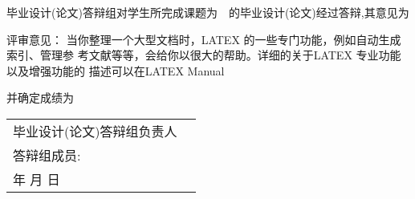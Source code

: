 毕业设计(论文)答辩组对学生\myunderline[10]{\@student}所完成课题为~\CJKunderline*{\@yourtitle}~的毕业设计(论文)经过答辩,其意见为
\begin{ulfield1}[7]{评审意见：}
当你整理一个大型文档时，LATEX 的一些专门功能，例如自动生成索引、管理参
考文献等等，会给你以很大的帮助。详细的关于LATEX 专业功能以及增强功能的
描述可以在LATEX Manual
\end{ulfield1}
\newline 并确定成绩为~\CJKunderline*{\hfill}


\begin{minipage}[t]{1\linewidth} 
\hskip 8cm
\begin{tabular*}{0.2\linewidth}{lp{2cm}}
毕业设计(论文)答辩组负责人\\
答辩组成员:  \\
\quad 年  \quad 月 \quad 日\\
\end{tabular*}
 \end{minipage}